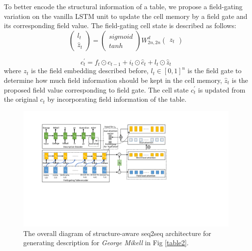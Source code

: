 \documentclass[letterpaper]{article} %
\begin{document}
To better encode the structural information of a table, we propose a field-gating variation on the vanilla LSTM unit to update the cell memory by a field gate and its corresponding field value. The field-gating cell state is described as follows:   
 \begin{equation}
\begin{pmatrix}
l_t\\
\hat{z}_t
\end{pmatrix}
= 
\begin{pmatrix}
sigmoid\\
tanh
\end{pmatrix}
W_{2n,2n}^d
\begin{pmatrix}
z_t
\end{pmatrix}
\end{equation}

\begin{equation}
	c_t^{'} = f_t \odot c_{t-1} + i_t \odot \hat{c}_t + l_t \odot \hat{z}_t
\end{equation}
where $z_t$ is the field embedding described before, $l_t\in [0,1]^n$ is the field gate to determine how much field information should be kept in the cell memory, $\hat{z}_t$ is the proposed field value corresponding to field gate. The cell state $c_t^{'}$ is updated from the original $c_t$ by incorporating field information of the table.

\begin{figure}[]
\centering
\includegraphics[width=0.9\linewidth]{pic22}
\caption{The overall diagram of structure-aware seq2seq architecture for generating description for \textit{George Mikell} in Fig \ref{table2}.}\label{mmodel}
\end{figure}
\end{document}
